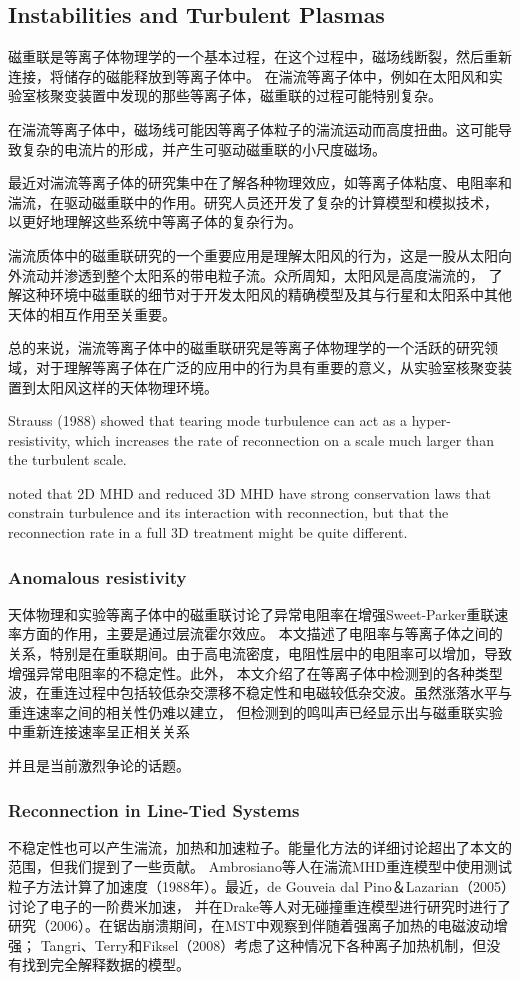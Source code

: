 \documentclass[12pt, a4paper, oneside]{article}
\begin{document}
\begin{spacing}{2.0}
\subsection{Instabilities and Turbulent Plasmas}
磁重联是等离子体物理学的一个基本过程，在这个过程中，磁场线断裂，然后重新连接，将储存的磁能释放到等离子体中。
在湍流等离子体中，例如在太阳风和实验室核聚变装置中发现的那些等离子体，磁重联的过程可能特别复杂。

在湍流等离子体中，磁场线可能因等离子体粒子的湍流运动而高度扭曲。这可能导致复杂的电流片的形成，并产生可驱动磁重联的小尺度磁场。

最近对湍流等离子体的研究集中在了解各种物理效应，如等离子体粘度、电阻率和湍流，在驱动磁重联中的作用。研究人员还开发了复杂的计算模型和模拟技术，
以更好地理解这些系统中等离子体的复杂行为。

湍流质体中的磁重联研究的一个重要应用是理解太阳风的行为，这是一股从太阳向外流动并渗透到整个太阳系的带电粒子流。众所周知，太阳风是高度湍流的，
了解这种环境中磁重联的细节对于开发太阳风的精确模型及其与行星和太阳系中其他天体的相互作用至关重要。

总的来说，湍流等离子体中的磁重联研究是等离子体物理学的一个活跃的研究领域，对于理解等离子体在广泛的应用中的行为具有重要的意义，从实验室核聚变装置到太阳风这样的天体物理环境。

Strauss (1988) showed that tearing mode turbulence
can act as a hyper-resistivity, which increases the rate of reconnection on a scale much larger than
the turbulent scale. 

noted that 2D MHD and reduced 3D MHD have
strong conservation laws that constrain turbulence and its interaction with reconnection, but that
the reconnection rate in a full 3D treatment might be quite different.


\subsubsection{Anomalous resistivity}
天体物理和实验等离子体中的磁重联讨论了异常电阻率在增强Sweet-Parker重联速率方面的作用，主要是通过层流霍尔效应。
本文描述了电阻率与等离子体之间的关系，特别是在重联期间。由于高电流密度，电阻性层中的电阻率可以增加，导致增强异常电阻率的不稳定性。此外，
本文介绍了在等离子体中检测到的各种类型波，在重连过程中包括较低杂交漂移不稳定性和电磁较低杂交波。虽然涨落水平与重连速率之间的相关性仍难以建立，
但检测到的鸣叫声已经显示出与磁重联实验中重新连接速率呈正相关关系

并且是当前激烈争论的话题。
\subsubsection{Reconnection in Line-Tied Systems}
不稳定性也可以产生湍流，加热和加速粒子。能量化方法的详细讨论超出了本文的范围，但我们提到了一些贡献。
Ambrosiano等人在湍流MHD重连模型中使用测试粒子方法计算了加速度（1988年）。最近，de Gouveia dal Pino＆Lazarian（2005）讨论了电子的一阶费米加速，
并在Drake等人对无碰撞重连模型进行研究时进行了研究（2006）。在锯齿崩溃期间，在MST中观察到伴随着强离子加热的电磁波动增强；
Tangri、Terry和Fiksel（2008）考虑了这种情况下各种离子加热机制，但没有找到完全解释数据的模型。


\end{spacing}
\end{document}
